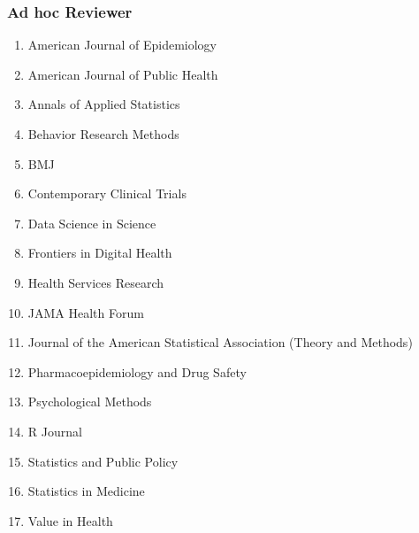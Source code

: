 \documentclass[letterpaper,11pt]{article} %
\begin{document}
    \subsubsection*{Ad hoc Reviewer}
	\begin{enumerate}[noitemsep,leftmargin = 1.25em]
		\item[] American Journal of Epidemiology
		\item[] American Journal of Public Health
		\item[] Annals of Applied Statistics
		\item[] Behavior Research Methods
            \item[] BMJ
            \item[] Contemporary Clinical Trials
            \item[] Data Science in Science
		\item[] Frontiers in Digital Health
            \item[] Health Services Research
            \item[] JAMA Health Forum
		\item[] Journal of the American Statistical Association (Theory and Methods)
		\item[] Pharmacoepidemiology and Drug Safety
		\item[] Psychological Methods
		\item[] R Journal
		\item[] Statistics and Public Policy
		\item[] Statistics in Medicine
		\item[] Value in Health
	\end{enumerate}
	
\end{document}
